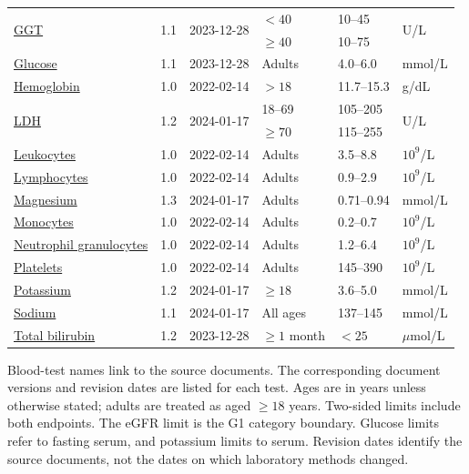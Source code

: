 \begin{table}[H]
\begin{tabular}{@{}lcllll@{}}
\multirow{2}{*}{\href{https://metodebok.no/emne/KBR3eLmA}{GGT}} & \multirow{2}{*}{1.1} & \multirow{2}{*}{2023-12-28} & $<40$ & 10--45 & \multirow{2}{*}{U/L} \\
 &  &  & $\geq 40$ & 10--75 &  \\
\midrule[0.25pt]
\href{https://metodebok.no/emne/FHwFXw7n}{Glucose} & 1.1 & 2023-12-28 & Adults & 4.0--6.0 & mmol/L \\
\midrule[0.25pt]
\href{https://metodebok.no/emne/B57pLY6g}{Hemoglobin} & 1.0 & 2022-02-14 & $>18$ & 11.7--15.3 & g/dL \\
\midrule[0.25pt]
\multirow{2}{*}{\href{https://metodebok.no/emne/MhEF2faw}{LDH}} & \multirow{2}{*}{1.2} & \multirow{2}{*}{2024-01-17} & 18--69 & 105--205 & \multirow{2}{*}{U/L} \\
 &  &  & $\geq 70$ & 115--255 &  \\
\midrule[0.25pt]
\href{https://metodebok.no/emne/ytBAWGgY}{Leukocytes} & 1.0 & 2022-02-14 & Adults & 3.5--8.8 & $10^9$/L \\
\midrule[0.25pt]
\href{https://metodebok.no/emne/qtFMX6KQ}{Lymphocytes} & 1.0 & 2022-02-14 & Adults & 0.9--2.9 & $10^9$/L \\
\midrule[0.25pt]
\href{https://metodebok.no/emne/y6cRSp29}{Magnesium} & 1.3 & 2024-01-17 & Adults & 0.71--0.94 & mmol/L \\
\midrule[0.25pt]
\href{https://metodebok.no/emne/qtFMX6KQ}{Monocytes} & 1.0 & 2022-02-14 & Adults & 0.2--0.7 & $10^9$/L \\
\midrule[0.25pt]
\href{https://metodebok.no/emne/qtFMX6KQ}{Neutrophil granulocytes} & 1.0 & 2022-02-14 & Adults & 1.2--6.4 & $10^9$/L \\
\midrule[0.25pt]
\href{https://metodebok.no/emne/G2ifxeZ8}{Platelets} & 1.0 & 2022-02-14 & Adults & 145--390 & $10^9$/L \\
\midrule[0.25pt]
\href{https://metodebok.no/emne/zkcpXP3E}{Potassium} & 1.2 & 2024-01-17 & $\geq 18$ & 3.6--5.0 & mmol/L \\
\midrule[0.25pt]
\href{https://metodebok.no/emne/ZCfhwEJb}{Sodium} & 1.1 & 2024-01-17 & All ages & 137--145 & mmol/L \\
\midrule[0.25pt]
\href{https://metodebok.no/emne/M6NKujFS}{Total bilirubin} & 1.2 & 2023-12-28 & $\geq 1$ month & $<25$ & $\mu$mol/L \\
\bottomrule
\end{tabular}
\par\smallskip
\begin{minipage}{\linewidth}\footnotesize
Blood-test names link to the source documents. The corresponding document versions and revision dates are listed for each test. Ages are in years unless otherwise stated; adults are treated as aged $\geq18$ years. Two-sided limits include both endpoints. The eGFR limit is the G1 category boundary. Glucose limits refer to fasting serum, and potassium limits to serum. Revision dates identify the source documents, not the dates on which laboratory methods changed.
\end{minipage}
\end{table}
